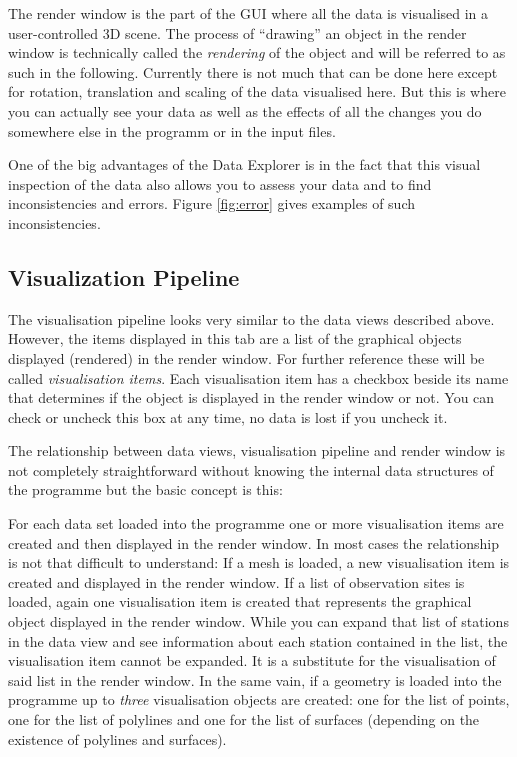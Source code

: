 The render window is the part of the GUI where all the data is visualised in a user-controlled 3D scene. The process of ``drawing'' an object in the render window is technically called the \emph{rendering} of the object and will be referred to as such in the following. Currently there is not much that can be done here except for rotation, translation and scaling of the data visualised here. But this is where you can actually see your data as well as the effects of all the changes you do somewhere else in the programm or in the input files.

One of the big advantages of the Data Explorer is in the fact that this visual inspection of the data also allows you to assess your data and to find inconsistencies and errors. Figure \ref{fig:error} gives examples of such inconsistencies.

\subsection{Visualization Pipeline}

The visualisation pipeline looks very similar to the data views described above. However, the items displayed in this tab are a list of the graphical objects displayed (rendered) in the render window. For further reference these will be called \emph{visualisation items}. Each visualisation item has a checkbox beside its name that determines if the object is displayed in the render window or not. You can check or uncheck this box at any time, no data is lost if you uncheck it.

The relationship between data views, visualisation pipeline and render window is not completely straightforward without knowing the internal data structures of the programme but the basic concept is this:

For each data set loaded into the programme one or more visualisation items are created and then displayed in the render window. In most cases the relationship is not that difficult to understand: If a mesh is loaded, a new visualisation item is created and displayed in the render window. If a list of observation sites is loaded, again one visualisation item is created that represents the graphical object displayed in the render window. While you can expand that list of stations in the data view and see information about each station contained in the list, the visualisation item cannot be expanded. It is a substitute for the visualisation of said list in the render window. In the same vain, if a geometry is loaded into the programme up to \emph{three} visualisation objects are created: one for the list of points, one for the list of polylines and one for the list of surfaces (depending on the existence of polylines and surfaces).

